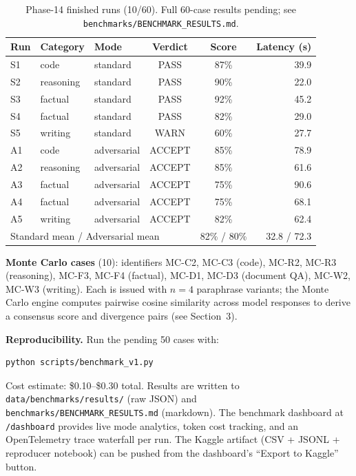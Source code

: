 \documentclass{article}
\begin{document}
\begin{table}[h!]
\centering
\small
\caption{Phase-14 finished runs (10/60). Full 60-case results pending; see
\texttt{benchmarks/BENCHMARK\_RESULTS.md}.}
\label{tab:bench60_finished}
\begin{tabular}{@{}lllccr@{}}
\toprule
Run & Category & Mode & Verdict & Score & Latency (s) \\
\midrule
S1 & code      & standard    & PASS   & 87\% & 39.9 \\
S2 & reasoning & standard    & PASS   & 90\% & 22.0 \\
S3 & factual   & standard    & PASS   & 92\% & 45.2 \\
S4 & factual   & standard    & PASS   & 82\% & 29.0 \\
S5 & writing   & standard    & WARN   & 60\% & 27.7 \\
A1 & code      & adversarial & ACCEPT & 85\% & 78.9 \\
A2 & reasoning & adversarial & ACCEPT & 85\% & 61.6 \\
A3 & factual   & adversarial & ACCEPT & 75\% & 90.6 \\
A4 & factual   & adversarial & ACCEPT & 75\% & 68.1 \\
A5 & writing   & adversarial & ACCEPT & 82\% & 62.4 \\
\midrule
\multicolumn{4}{l}{Standard mean / Adversarial mean} & 82\% / 80\% & 32.8 / 72.3 \\
\bottomrule
\end{tabular}
\end{table}

\textbf{Monte Carlo cases} (10): identifiers MC-C2, MC-C3 (code), MC-R2, MC-R3
(reasoning), MC-F3, MC-F4 (factual), MC-D1, MC-D3 (document QA), MC-W2, MC-W3
(writing). Each is issued with $n=4$ paraphrase variants; the Monte Carlo engine computes
pairwise cosine similarity across model responses to derive a consensus score and
divergence pairs (see Section~3).

\textbf{Reproducibility.} Run the pending 50 cases with:
\begin{verbatim}
python scripts/benchmark_v1.py
\end{verbatim}
Cost estimate: \$0.10--\$0.30 total. Results are written to
\texttt{data/benchmarks/results/} (raw JSON) and
\texttt{benchmarks/BENCHMARK\_RESULTS.md} (markdown). The benchmark dashboard at
\texttt{/dashboard} provides live mode analytics, token cost tracking, and an
OpenTelemetry trace waterfall per run. The Kaggle artifact (CSV + JSONL + reproducer
notebook) can be pushed from the dashboard's ``Export to Kaggle'' button.
\end{document}
